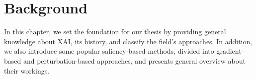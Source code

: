 \chapter{Background}
\label{ch:background}
In this chapter, we set the foundation for our thesis by providing general knowledge about XAI, its history, and classify the field's approaches. In addition, we also introduce some popular saliency-based methods, divided into gradient-based and perturbation-based approaches, and presents general overview about their workings.

